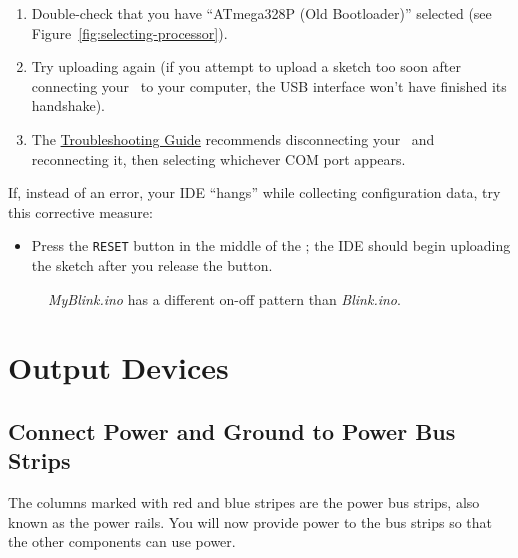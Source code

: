 \begin{enumerate}
    \item Double-check that you have ``ATmega328P (Old Bootloader)'' selected
        (see Figure~\ref{fig:selecting-processor}).
    \item Try uploading again (if you attempt to upload a sketch too soon after
        connecting your \nano\ to your computer, the USB interface won't have
        finished its handshake).
    \item The \href{https://support.arduino.cc/hc/en-us/articles/4401874331410--Error-avrdude-when-uploading}{Troubleshooting
        Guide} recommends disconnecting your \nano\ and reconnecting it, then
        selecting whichever COM port appears.
\end{enumerate}

If, instead of an error, your IDE ``hangs'' while collecting configuration data, try this corrective measure:

\begin{itemize}
\item Press the \texttt{RESET} button in the middle of the \nano; the IDE
    should begin uploading the sketch after you release the button.
\end{itemize}

\begin{figure}
    \centering
    \caption{\textit{MyBlink.ino} has a different on-off
        pattern than \textit{Blink.ino}.\label{fig:myblink}}
\end{figure}


\section{Output Devices}

\subsection{Connect Power and Ground to Power Bus Strips}

The columns marked with red and blue stripes are the power bus strips, also
known as the power rails. You will now provide power to the bus strips so that
the other components can use power.

\disconnect\

